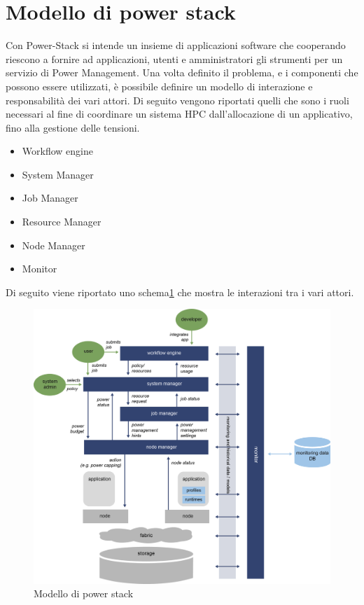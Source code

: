 \section{Modello di power stack} %
Con Power-Stack si intende un insieme di applicazioni software che cooperando riescono a fornire ad applicazioni, utenti e amministratori gli strumenti per un servizio di Power Management. Una volta definito il problema, e i componenti che possono essere utilizzati, è possibile definire un modello di interazione e responsabilità dei vari attori. Di seguito vengono riportati quelli che sono i ruoli necessari al fine di coordinare un sistema HPC dall'allocazione di un applicativo, fino alla gestione delle tensioni. 
\begin{itemize}
    \item Workflow engine
    \item System Manager
    \item Job Manager
    \item Resource Manager
    \item Node Manager
    \item Monitor
\end{itemize}
Di seguito viene riportato uno schema\ref{fig:powerstackscheme} che mostra le interazioni tra i vari attori.
\begin{figure}[H]
    \centering
    \includegraphics[width=\textwidth]{img/REGALE-Architecture-1536x1421.png}
    \caption{Modello di power stack} 
    \label{fig:powerstackscheme}
\end{figure}
